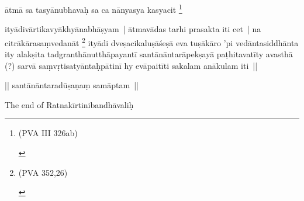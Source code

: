 \documentclass[article,12pt,a4paper]{memoir}
\begin{document}
	  \pstart ātmā sa tasyānubhavaḥ sa ca nānyasya kasyacit \footnote{\begin{english}(PVA III 326ab)\end{english}}
	\pend
      

	  \pstart ityādivārtikavyākhyānabhāṣyam | \label{thakur75-149.18} ātmavādas tarhi prasakta iti cet | na citrākārasaṃvedanāt \footnote{\begin{english}(PVA 352,26)\end{english}} ityādi dveṣacikaluṣāśeṣā eva tuṣākāro 'pi vedāntasiddhānta ity alakṣita tadgranthānutthāpayantī santānāntarāpekṣayā paṭhitavatīty avasthā (?) sarvā saṃvṛtisatyāntaḥpātinī hy evāpaitīti sakalam anākulam iti ||
	\pend
      

	  \pstart || santānāntaradūṣaṇaṃ samāptam || \textunderscore \textunderscore \textunderscore \textunderscore \textunderscore \textunderscore \textunderscore \textunderscore \textunderscore \textunderscore \textunderscore \textunderscore \textunderscore \textunderscore \textunderscore \textunderscore \textunderscore \textunderscore \textunderscore \textunderscore \textunderscore \textunderscore \textunderscore \textunderscore \textunderscore \textunderscore \textunderscore \textunderscore \textunderscore \textunderscore \textunderscore \textunderscore \textunderscore \textunderscore \textunderscore \textunderscore \textunderscore \textunderscore \textunderscore \textunderscore \textunderscore \textunderscore \textunderscore \textunderscore \textunderscore \textunderscore \textunderscore \textunderscore \textunderscore \textunderscore \textunderscore \textunderscore \textunderscore \textunderscore \textunderscore \textunderscore \textunderscore \textunderscore \textunderscore 
	\pend
      

	  \pstart The end of Ratnakīrtinibandhāvaliḥ 
	\pend
      
	    
	    \endnumbering%
	    \endgroup
	    
	  \backmatter 
\end{document}
